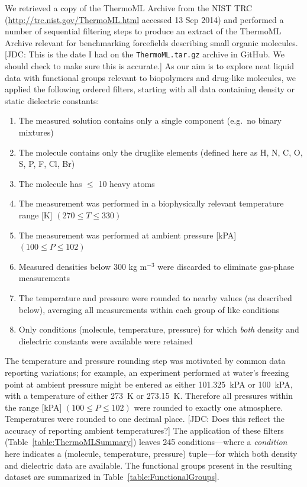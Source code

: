 \documentclass[aps,pre,twocolumn,nofootinbib,superscriptaddress,linenumbers]{revtex4-1}
\begin{document}
We retrieved a copy of the ThermoML Archive from the NIST TRC (\url{http://trc.nist.gov/ThermoML.html} accessed 13 Sep 2014) and performed a number of sequential filtering steps to produce an extract of the ThermoML Archive relevant for benchmarking forcefields describing small organic molecules.  
{\color{red}[JDC: This is the date I had on the {\tt ThermoML.tar.gz} archive in GitHub. We should check to make sure this is accurate.]}
As our aim is to explore neat liquid data with functional groups relevant to biopolymers and drug-like molecules, we applied the following ordered filters, starting with all data containing density or static dielectric constants: 
\begin{enumerate}
 \item The measured solution contains only a single component (e.g.~no binary mixtures)
 \item The molecule contains only the druglike elements (defined here as H, N, C, O, S, P, F, Cl, Br)
 \item The molecule has $\le$ 10 heavy atoms
 \item The measurement was performed in a biophysically relevant temperature range [K] $(270 \le T \le 330)$
 \item The measurement was performed at ambient pressure [kPA] $(100 \le P \le 102)$
 \item Measured densities below 300 kg m$^{-3}$ were discarded to eliminate gas-phase measurements
 \item The temperature and pressure were rounded to nearby values (as described below), averaging all measurements within each group of like conditions
 \item Only conditions (molecule, temperature, pressure) for which \emph{both} density and dielectric constants were available were retained
\end{enumerate}
The temperature and pressure rounding step was motivated by common data reporting variations; for example, an experiment performed at water's freezing point at ambient pressure might be entered as either 101.325~kPA or 100~kPA, with a temperature of either 273~K or 273.15~K.  
Therefore all pressures within the range [kPA] $(100 \le P \le 102)$ were rounded to exactly one atmosphere.  
Temperatures were rounded to one decimal place. {\color{red}[JDC: Does this reflect the accuracy of reporting ambient temperatures?]}
The application of these filters (Table~\ref{table:ThermoMLSummary}) leaves 245 conditions---where a \emph{condition} here indicates a (molecule, temperature, pressure) tuple---for which both density and dielectric data are available.  
The functional groups present in the resulting dataset are summarized in Table~\ref{table:FunctionalGroups}.  
\end{document}
